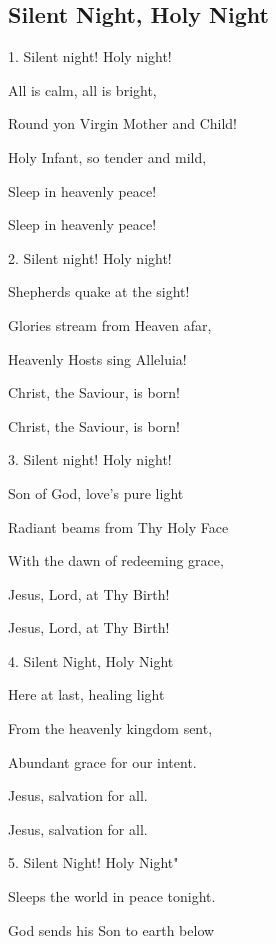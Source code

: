 \subsection{Silent Night, Holy Night}\label{silent_night}
\begin{description}[nosep,leftmargin=\parindent,labelsep=0pt]
\item 1. Silent night! Holy night! 
\item All is calm, all is bright, 
\item Round yon Virgin Mother and Child! 
\item Holy Infant, so tender and mild, 
\item Sleep in heavenly peace! 
\item Sleep in heavenly peace! 
\vspace{1.5ex}
\item 2. Silent night! Holy night! 
\item Shepherds quake at the sight! 
\item Glories stream from Heaven afar, 
\item Heavenly Hosts sing Alleluia! 
\item Christ, the Saviour, is born! 
\item Christ, the Saviour, is born! 
\vspace{1.5ex}
\item 3. Silent night! Holy night! 
\item Son of God, love’s pure light 
\item Radiant beams from Thy Holy Face 
\item With the dawn of redeeming grace, 
\item Jesus, Lord, at Thy Birth! 
\item Jesus, Lord, at Thy Birth! 
\vspace{1.5ex}
\item 4. Silent Night, Holy Night 
\item Here at last, healing light 
\item From the heavenly kingdom sent, 
\item Abundant grace for our intent. 
\item Jesus, salvation for all. 
\item Jesus, salvation for all. 
\vspace{1.5ex}
\item 5. Silent Night! Holy Night" 
\item Sleeps the world in peace tonight. 
\item God sends his Son to earth below 

\end{description}
